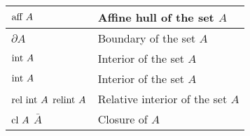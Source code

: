 \begin{xltabular}{\textwidth}{XX}
	\(\textnormal{aff } A\) \cite[p. 23]{boydConvexOptimization2004}                                                                                                  & Affine hull of the set \(A\)                                                                                                                                                                                                    \\ \hline
	\(\partial A\) \cite[sec. 2.1.7]{dattorroConvexOptimizationEuclidean2010}                                                                                                  & Boundary of the set \(A\)                                                                                                                                                                                                    \\ \hline
	\(\textnormal{int } A\) \cite[sec. 2.1.6.1]{dattorroConvexOptimizationEuclidean2010}                                                                                       & Interior of the set \(A\)                                                                                                                                                                                                    \\ \hline
	\(\textnormal{int } A\) \cite[sec. 2.1.6.1]{dattorroConvexOptimizationEuclidean2010} \cite[2.1.3]{boydConvexOptimization2004}                                                                                       & Interior of the set \(A\)                                                                                                                                                                                                    \\ \hline
	\(\textnormal{rel int } A\) \cite[sec. 2.1.6.1]{dattorroConvexOptimizationEuclidean2010} \newline \(\textnormal{relint } A\) \cite[2.1.3]{boydConvexOptimization2004}                                                                                       & Relative interior of the set \(A\)                                                                                                                                                                                                    \\ \hline
	\(\textnormal{cl } A\) \cite[Appendix A.2]{boydConvexOptimization2004} \newline \(\bar{A}\) \cite[sec. 2.1.6.1]{dattorroConvexOptimizationEuclidean2010} & Closure of \(A\)                                                                                                                                                                                                    \\ \hline

\end{xltabular}
